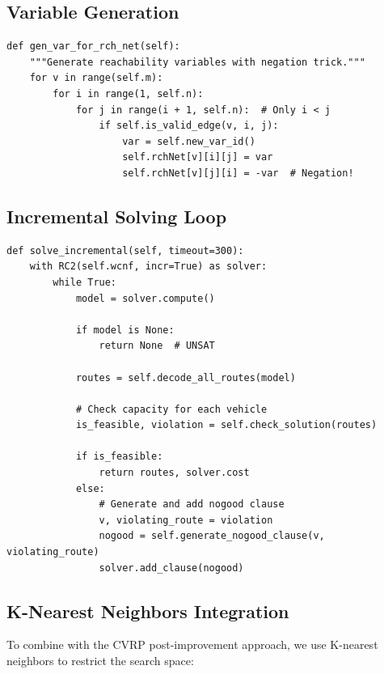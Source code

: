 \documentclass[12pt,a4paper]{article}
\theoremstyle{definition}
\begin{document}
\subsection{Variable Generation}

\begin{lstlisting}[caption={Variable Generation with Optimization}]
def gen_var_for_rch_net(self):
    """Generate reachability variables with negation trick."""
    for v in range(self.m):
        for i in range(1, self.n):
            for j in range(i + 1, self.n):  # Only i < j
                if self.is_valid_edge(v, i, j):
                    var = self.new_var_id()
                    self.rchNet[v][i][j] = var
                    self.rchNet[v][j][i] = -var  # Negation!
\end{lstlisting}

\subsection{Incremental Solving Loop}

\begin{lstlisting}[caption={Main Incremental Solving Loop}]
def solve_incremental(self, timeout=300):
    with RC2(self.wcnf, incr=True) as solver:
        while True:
            model = solver.compute()
            
            if model is None:
                return None  # UNSAT
            
            routes = self.decode_all_routes(model)
            
            # Check capacity for each vehicle
            is_feasible, violation = self.check_solution(routes)
            
            if is_feasible:
                return routes, solver.cost
            else:
                # Generate and add nogood clause
                v, violating_route = violation
                nogood = self.generate_nogood_clause(v, violating_route)
                solver.add_clause(nogood)
\end{lstlisting}

\subsection{K-Nearest Neighbors Integration}

To combine with the CVRP post-improvement approach, we use K-nearest neighbors to restrict the search space:
\end{document}
